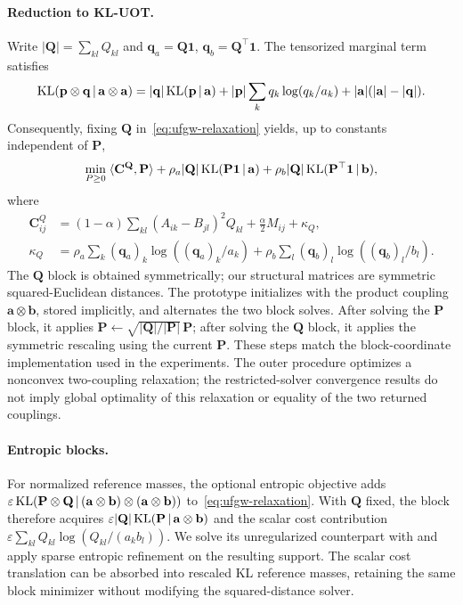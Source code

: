 \paragraph{Reduction to KL-UOT.}
Write $|\mathbf{Q}|=\sum_{kl}Q_{kl}$ and $\mathbf{q}_a=\mathbf{Q}\mathbf{1}$, $\mathbf{q}_b=\mathbf{Q}^\top\mathbf{1}$.
The tensorized marginal term satisfies
\begin{equation*}
\operatorname{KL}(\mathbf{p}\otimes \mathbf{q}\,|\,\mathbf{a}\otimes \mathbf{a})
=|\mathbf{q}|\operatorname{KL}(\mathbf{p}\,|\,\mathbf{a})+|\mathbf{p}|\sum_kq_k\log(q_k/a_k)+|\mathbf{a}|(|\mathbf{a}|-|\mathbf{q}|).
\end{equation*}
Consequently, fixing $\mathbf{Q}$ in~\eqref{eq:ufgw-relaxation} yields, up to constants independent of $\mathbf{P}$,
\begin{equation*}
\min_{P\geq0}\;\langle \mathbf{C}^\mathbf{Q},\mathbf{P}\rangle+\rho_a|\mathbf{Q}|\operatorname{KL}(\mathbf{P}\mathbf{1}\,|\,\mathbf{a})+\rho_b|\mathbf{Q}|\operatorname{KL}(\mathbf{P}^\top\mathbf{1}\,|\,\mathbf{b}),
\end{equation*}
where
\begin{equation*}
\begin{aligned}
\mathbf{C}^Q_{ij}&=(1-\alpha)\sum_{kl}(A_{ik}-B_{jl})^2Q_{kl}+\frac{\alpha}{2}M_{ij}+\kappa_Q,\\
\kappa_Q&=\rho_a\sum_k(\mathbf{q}_a)_k\log((\mathbf{q}_a)_k/a_k)+\rho_b\sum_l(\mathbf{q}_b)_l\log((\mathbf{q}_b)_l/b_l).
\end{aligned}
\end{equation*}
The $\mathbf{Q}$ block is obtained symmetrically; our structural matrices are symmetric squared-Euclidean distances.
The prototype initializes with the product coupling $\mathbf{a}\otimes \mathbf{b}$, stored implicitly, and alternates the two block solves.
After solving the $\mathbf{P}$ block, it applies $\mathbf{P}\leftarrow\sqrt{|\mathbf{Q}|/|\mathbf{P}|}\,\mathbf{P}$; after solving the $\mathbf{Q}$ block, it applies the symmetric rescaling using the current $\mathbf{P}$.
These steps match the block-coordinate implementation used in the experiments.
The outer procedure optimizes a nonconvex two-coupling relaxation; the restricted-solver convergence results do not imply global optimality of this relaxation or equality of the two returned couplings.

\paragraph{Entropic blocks.}
For normalized reference masses, the optional entropic objective adds $\varepsilon\operatorname{KL}(\mathbf{P}\otimes \mathbf{Q}\,|\,(\mathbf{a}\otimes \mathbf{b})\otimes(\mathbf{a}\otimes \mathbf{b}))$ to~\eqref{eq:ufgw-relaxation}.
With $\mathbf{Q}$ fixed, the block therefore acquires $\varepsilon|\mathbf{Q}|\operatorname{KL}(\mathbf{P}\,|\,\mathbf{a}\otimes \mathbf{b})$ and the scalar cost contribution $\varepsilon\sum_{kl}Q_{kl}\log(Q_{kl}/(a_kb_l))$.
We solve its unregularized counterpart with \ours and apply sparse entropic refinement on the resulting support.
The scalar cost translation can be absorbed into rescaled KL reference masses, retaining the same block minimizer without modifying the squared-distance solver.

